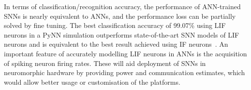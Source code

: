 	In terms of classification/recognition accuracy, the performance of ANN-trained SNNs is nearly equivalent to ANNs, and the performance loss can be partially solved by fine tuning.
	The best classification accuracy of 99.07\% using LIF neurons in a PyNN simulation outperforms state-of-the-art SNN models of LIF neurons and is equivalent to the best result achieved using IF neurons~\DIFdelbegin {}\DIFdelend \DIFaddbegin {}\DIFaddend .
	An important feature of accurately modelling LIF neurons in ANNs is the acquisition of spiking neuron firing rates. These will aid deployment of SNNs in neuromorphic hardware by providing power and communication estimates, which would allow better usage or customisation of the platforms.